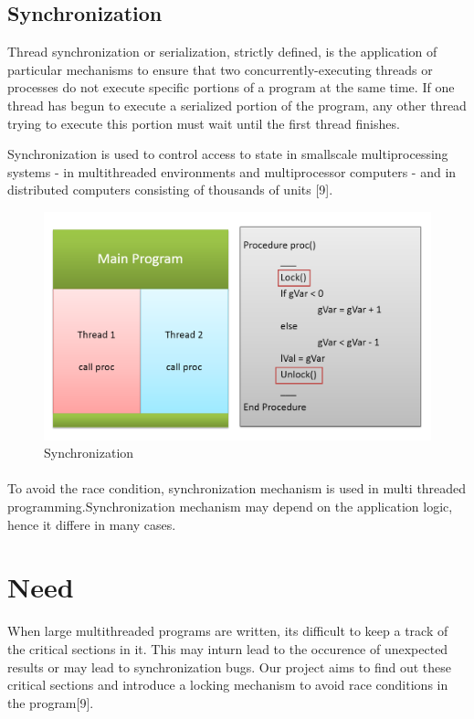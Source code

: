 \subsection{Synchronization}

Thread synchronization or serialization, strictly defined, is the application of particular mechanisms to ensure that two concurrently-executing threads or processes do not execute specific portions of a program at the same time. If one thread has begun to execute a serialized portion of the program, any other thread trying to execute this portion must wait until the first thread finishes.

Synchronization is used to control access to state in smallscale multiprocessing systems - in multithreaded environments and multiprocessor computers - and in distributed computers consisting of thousands of units [9].
\begin{figure}[H]
\centering
\includegraphics[scale=0.5]{synch.png}
\caption{Synchronization}
\label{<<Label>>}
\end{figure}
\paragraph{}
To avoid the race condition, synchronization mechanism is used in multi threaded programming.Synchronization mechanism may depend on the application logic, hence it differe in many cases.
\section{Need}
When large multithreaded programs are written, its difficult to keep a track of the critical sections in it. This may inturn lead to the occurence of unexpected results or may lead to synchronization bugs. Our project aims to find out these critical sections and introduce a locking mechanism to avoid race conditions in the program[9].

